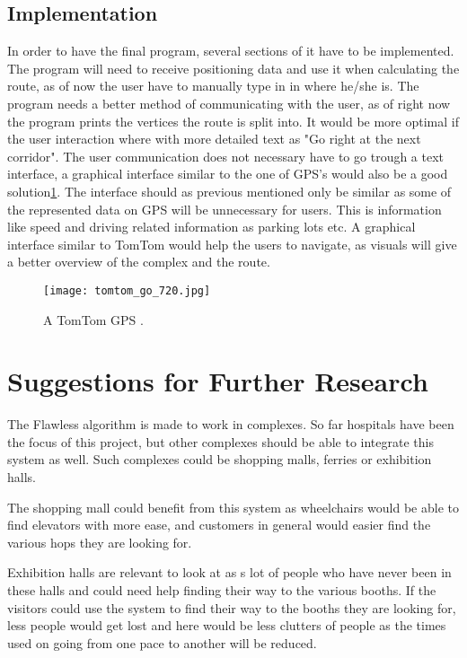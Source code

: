 \subsection{Implementation}

In order to have the final program, several sections of it have to be implemented. The program will need to receive positioning data and use it when calculating the route, as of now the user have to manually type in in where he/she is. The program needs a better method of communicating with the user, as of right now the program prints the vertices the route is split into. It would be more optimal if the user interaction where with more detailed text as "Go right at the next corridor". The user communication does not necessary have to go trough a text interface, a graphical interface similar to the one of GPS's would also be a good solution\cref{fig:TomTom}. The interface should as previous mentioned only be similar as some of the represented data on GPS will be unnecessary for users. This is information like speed and driving related information as parking lots etc. A graphical interface similar to TomTom would help the users to navigate, as visuals will give a better overview of the complex and the route. 

\begin{figure}
\centering
    \texttt{[image: tomtom\_go\_720.jpg]}
    \caption{A TomTom GPS \cite{diss_tomtom}.} \label{fig:TomTom}
\end{figure}


\section{Suggestions for Further Research}

The Flawless algorithm is made to work in complexes. So far hospitals have been the focus of this project, but other complexes should be able to integrate this system as well. Such complexes could be shopping malls, ferries or exhibition halls. 

The shopping mall could benefit from this system as wheelchairs would be able to find elevators with more ease, and customers in general would easier find the various hops they are looking for. 

Exhibition halls are relevant to look at as s lot of people who have never been in these halls and could need help finding their way to the various booths. If the visitors could use the system to find their way to the booths they are looking for, less people would get lost and here would be less clutters of people as the times used on going from one pace to another will be reduced. 
\newline 

